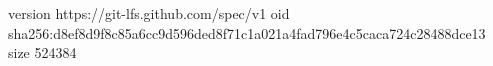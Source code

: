 version https://git-lfs.github.com/spec/v1
oid sha256:d8ef8d9f8c85a6cc9d596ded8f71c1a021a4fad796e4c5caca724c28488dce13
size 524384
